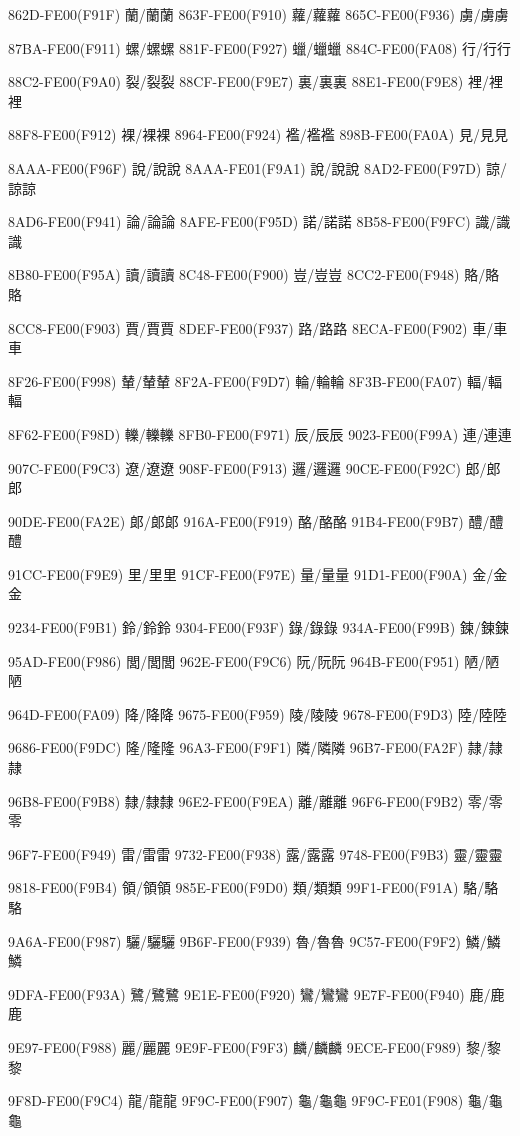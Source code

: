 862D-FE00(F91F) 蘭/蘭︀蘭 
863F-FE00(F910) 蘿/蘿︀蘿 
865C-FE00(F936) 虜/虜︀虜\par
87BA-FE00(F911) 螺/螺︀螺 
881F-FE00(F927) 蠟/蠟︀蠟 
884C-FE00(FA08) 行/行︀行\par
88C2-FE00(F9A0) 裂/裂︀裂 
88CF-FE00(F9E7) 裏/裏︀裏 
88E1-FE00(F9E8) 裡/裡︀裡\par
88F8-FE00(F912) 裸/裸︀裸 
8964-FE00(F924) 襤/襤︀襤 
898B-FE00(FA0A) 見/見︀見\par
8AAA-FE00(F96F) 說/說︀說 
8AAA-FE01(F9A1) 說/說︁說 
8AD2-FE00(F97D) 諒/諒︀諒\par
8AD6-FE00(F941) 論/論︀論 
8AFE-FE00(F95D) 諾/諾︀諾 
8B58-FE00(F9FC) 識/識︀識\par
8B80-FE00(F95A) 讀/讀︀讀 
8C48-FE00(F900) 豈/豈︀豈 
8CC2-FE00(F948) 賂/賂︀賂\par
8CC8-FE00(F903) 賈/賈︀賈 
8DEF-FE00(F937) 路/路︀路 
8ECA-FE00(F902) 車/車︀車\par
8F26-FE00(F998) 輦/輦︀輦 
8F2A-FE00(F9D7) 輪/輪︀輪 
8F3B-FE00(FA07) 輻/輻︀輻\par
8F62-FE00(F98D) 轢/轢︀轢 
8FB0-FE00(F971) 辰/辰︀辰 
9023-FE00(F99A) 連/連︀連\par
907C-FE00(F9C3) 遼/遼︀遼 
908F-FE00(F913) 邏/邏︀邏 
90CE-FE00(F92C) 郎/郎︀郎\par
90DE-FE00(FA2E) 郞/郞︀郞 
916A-FE00(F919) 酪/酪︀酪 
91B4-FE00(F9B7) 醴/醴︀醴\par
91CC-FE00(F9E9) 里/里︀里 
91CF-FE00(F97E) 量/量︀量 
91D1-FE00(F90A) 金/金︀金\par
9234-FE00(F9B1) 鈴/鈴︀鈴 
9304-FE00(F93F) 錄/錄︀錄 
934A-FE00(F99B) 鍊/鍊︀鍊\par
95AD-FE00(F986) 閭/閭︀閭 
962E-FE00(F9C6) 阮/阮︀阮 
964B-FE00(F951) 陋/陋︀陋\par
964D-FE00(FA09) 降/降︀降 
9675-FE00(F959) 陵/陵︀陵 
9678-FE00(F9D3) 陸/陸︀陸\par
9686-FE00(F9DC) 隆/隆︀隆 
96A3-FE00(F9F1) 隣/隣︀隣 
96B7-FE00(FA2F) 隷/隷︀隷\par
96B8-FE00(F9B8) 隸/隸︀隸 
96E2-FE00(F9EA) 離/離︀離 
96F6-FE00(F9B2) 零/零︀零\par
96F7-FE00(F949) 雷/雷︀雷 
9732-FE00(F938) 露/露︀露 
9748-FE00(F9B3) 靈/靈︀靈\par
9818-FE00(F9B4) 領/領︀領 
985E-FE00(F9D0) 類/類︀類 
99F1-FE00(F91A) 駱/駱︀駱\par
9A6A-FE00(F987) 驪/驪︀驪 
9B6F-FE00(F939) 魯/魯︀魯 
9C57-FE00(F9F2) 鱗/鱗︀鱗\par
9DFA-FE00(F93A) 鷺/鷺︀鷺 
9E1E-FE00(F920) 鸞/鸞︀鸞 
9E7F-FE00(F940) 鹿/鹿︀鹿\par
9E97-FE00(F988) 麗/麗︀麗 
9E9F-FE00(F9F3) 麟/麟︀麟 
9ECE-FE00(F989) 黎/黎︀黎\par
9F8D-FE00(F9C4) 龍/龍︀龍 
9F9C-FE00(F907) 龜/龜︀龜 
9F9C-FE01(F908) 龜/龜︁龜\par
